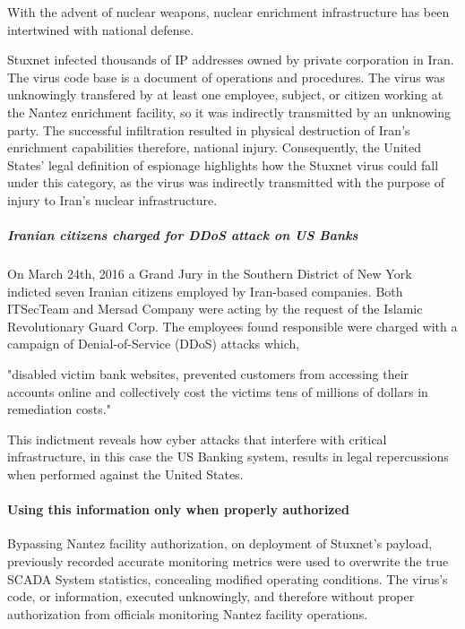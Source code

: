 \documentclass[12pt]{article}
\begin{document}
\begin{multicols}{2}
With the advent of nuclear weapons, nuclear enrichment infrastructure has been intertwined with national defense.

Stuxnet infected thousands of IP addresses owned by private corporation in Iran. The virus code base is a document of operations and procedures. The virus was unknowingly transfered by at least one employee, subject, or citizen working at the Nantez enrichment facility, so it was indirectly transmitted by an unknowing party. The successful infiltration resulted in physical destruction of Iran's enrichment capabilities therefore, national injury. Consequently, the United States' legal definition of espionage highlights how the Stuxnet virus could fall under this category, as the virus was indirectly transmitted with the purpose of injury to Iran's nuclear infrastructure.

\subparagraph{Iranian citizens charged for DDoS attack on US Banks}

On March 24th, 2016 a Grand Jury in the Southern District of New York indicted seven Iranian citizens employed by Iran-based companies. Both ITSecTeam and Mersad Company were acting by the request of the Islamic Revolutionary Guard Corp. The employees found responsible were charged with a campaign of Denial-of-Service (DDoS) attacks which,

\begin{displayquote}
"disabled victim bank websites, prevented customers from accessing their accounts online and collectively cost the victims tens of millions of dollars in remediation costs."\cite{sevenIraniansIndicted} 
\end{displayquote}

This indictment reveals how cyber attacks that interfere with critical infrastructure, in this case the US Banking system, results in legal repercussions when performed against the United States.

\paragraph{Using this information only when properly authorized}

Bypassing Nantez facility authorization, on deployment of Stuxnet's payload, previously recorded accurate monitoring metrics were used to overwrite the true SCADA System statistics, concealing modified operating conditions.\cite{theRealStoryOfStuxnet} The virus's code, or information, executed unknowingly, and therefore without proper authorization from officials monitoring Nantez facility operations.


\end{multicols}
\end{document}

